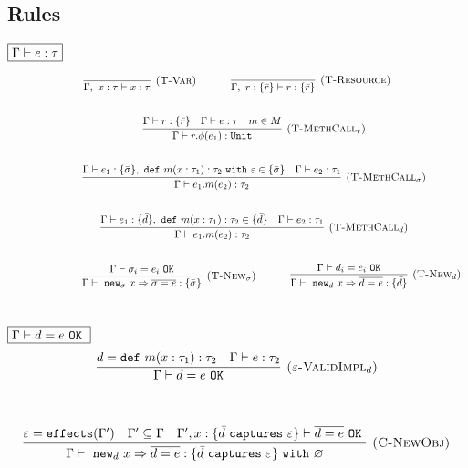\documentclass{llncs}
\newcommand{\keywadj}[1]{\mathtt{#1}}
\newcommand{\keyw}[1]{\keywadj{#1}~}
\begin{document}
\subsection{Rules}

$\fbox{$\Gamma \vdash e : \tau$}$

\[
\begin{array}{c}
\infer[\textsc{(T-Var)}]
	{\Gamma,~x : \tau \vdash x : \tau}
	{}
~~~~~~~~~~
\infer[\textsc{(T-Resource)}]
	{\Gamma,~r : \{ \bar r \} \vdash r : \{ \bar r \}}
	{} \\[5ex]
~~~~~~~~~~
\infer[\textsc{(T-MethCall$_r$)}]
	{\Gamma \vdash r.\phi(e_1) : \keywadj{Unit}}
	{\Gamma \vdash r : \{ \bar r \} & \Gamma \vdash e : \tau & m \in M} \\[5ex]
~~~~~~~~~~
\infer[\textsc{(T-MethCall$_\sigma$)}]
	{\Gamma \vdash e_1.m(e_2) : \tau_2}
	{\Gamma \vdash e_1 : \{ \bar \sigma \},~\keyw{def} m(x : \tau_1) : \tau_2~\keyw{with} \varepsilon \in \{ \bar \sigma \} &  \Gamma \vdash e_2 : \tau_1 }\\[5ex]
~~~~~~~~~~
\infer[\textsc{(T-MethCall$_d$)}]
	{\Gamma \vdash e_1.m(e_2) : \tau_2}
	{\Gamma \vdash e_1 : \{ \bar d\},~\keyw{def} m(x : \tau_1) : \tau_2 \in \{ \bar d \} &  \Gamma \vdash e_2 : \tau_1 }\\[5ex]
~~~~~~~~~~

~~~~~~~~~~
\infer[\textsc{(T-New$_\sigma$)}]
	{\Gamma \vdash~\keywadj{new}_\sigma~x \Rightarrow \overline{\sigma = e} : \{ \bar \sigma \}}
	{\Gamma \vdash \sigma_i = e_i~\keywadj{OK}}
~~~~~~~~~~
\infer[\textsc{(T-New$_d$)}]
	{\Gamma \vdash~\keywadj{new}_d~x \Rightarrow \overline{d = e} : \{ \bar d \}}
	{\Gamma \vdash d_i = e_i~\keywadj{OK}}\\[5ex]
\end{array}
\]

$\fbox{$\Gamma \vdash d = e~\keyw{OK}$}$
\[
\begin{array}{c}
\infer[\textsc{($\varepsilon$-ValidImpl$_d$)}]
	{\Gamma \vdash d = e~\keywadj{OK}}
	{d = \keyw{def} m(x : \tau_1) : \tau_2 & \Gamma \vdash e : \tau_2}
	\\[5ex]
\end{array}
\]

\fbox{$\Gamma \vdash e : \tau~\keyw{with} \varepsilon$}

\[
\begin{array}{c}
\infer[\textsc{(C-NewObj)}]
	{\Gamma \vdash~\keywadj{new}_d~x \Rightarrow \overline{d = e} : \{  \bar d~\keyw{captures} \varepsilon \} ~\keyw{with} \varnothing }
	{\varepsilon = \keywadj{effects}(\Gamma') & \Gamma' \subseteq \Gamma & \Gamma', x : \{ \bar d~\keyw {captures} \varepsilon \} \vdash \overline{d = e}~\keyw{OK}} \\[5ex]
\end{array}
\]
\end{document}
